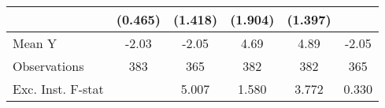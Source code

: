 {\begin{tabular}{l*{5}{c}}
            &     (0.465)         &     (1.418)         &     (1.904)         &     (1.397)         &                     \\
\midrule
Mean Y      &       -2.03         &       -2.05         &        4.69         &        4.89         &       -2.05         \\
Observations&         383         &         365         &         382         &         382         &         365         \\
Exc. Inst. F-stat&                     &       5.007         &       1.580         &       3.772         &       0.330         \\
\bottomrule
\end{tabular}
}
